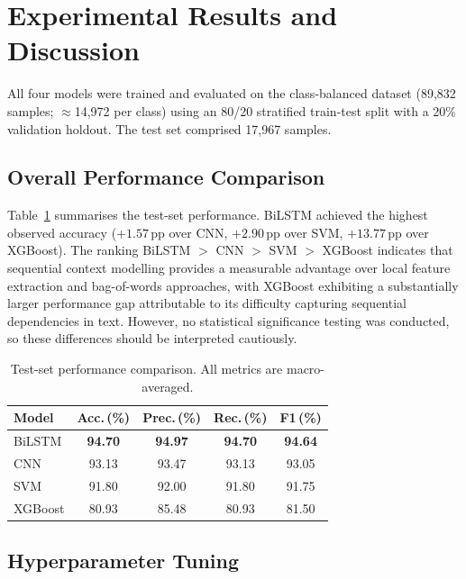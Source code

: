 \section{Experimental Results and Discussion}
\label{sec:results}

All four models were trained and evaluated on the class-balanced dataset (89,832 samples; $\approx$14,972 per class) using an 80/20 stratified train-test split with a 20\% validation holdout. The test set comprised 17,967 samples.

\subsection{Overall Performance Comparison}
\label{sec:perf}

Table~\ref{tab:results} summarises the test-set performance. BiLSTM achieved the highest observed accuracy ($+1.57$\,pp over CNN, $+2.90$\,pp over SVM, $+13.77$\,pp over XGBoost). The ranking BiLSTM $>$ CNN $>$ SVM $>$ XGBoost indicates that sequential context modelling provides a measurable advantage over local feature extraction and bag-of-words approaches, with XGBoost exhibiting a substantially larger performance gap attributable to its difficulty capturing sequential dependencies in text. However, no statistical significance testing was conducted, so these differences should be interpreted cautiously.

\begin{table}[!htb]
\centering
\caption{Test-set performance comparison. All metrics are macro-averaged.}
\label{tab:results}
\footnotesize
\begin{tabular}{@{}lcccc@{}}
\toprule
\textbf{Model} & \textbf{Acc.\,(\%)} & \textbf{Prec.\,(\%)} & \textbf{Rec.\,(\%)} & \textbf{F1\,(\%)} \\
\midrule
BiLSTM   & \textbf{94.70} & \textbf{94.97} & \textbf{94.70} & \textbf{94.64} \\
CNN      & 93.13 & 93.47 & 93.13 & 93.05 \\
SVM      & 91.80 & 92.00 & 91.80 & 91.75 \\
XGBoost  & 80.93 & 85.48 & 80.93 & 81.50 \\
\bottomrule
\end{tabular}
\end{table}

\subsection{Hyperparameter Tuning}
\label{sec:hyper}

